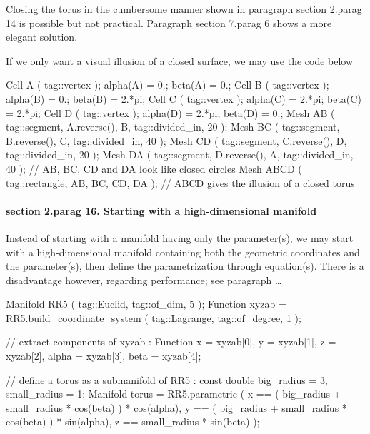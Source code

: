 Closing the torus in the cumbersome manner shown in paragraph \numb section 2.\numb parag 14
is possible but not practical.
Paragraph \numb section 7.\numb parag 6 shows a more elegant solution.

If we only want a visual illusion of a closed surface, we may use the code below

\verbatim
   Cell A ( tag::vertex );  alpha(A) = 0.;     beta(A) = 0.;
   Cell B ( tag::vertex );  alpha(B) = 0.;     beta(B) = 2.*pi;
   Cell C ( tag::vertex );  alpha(C) = 2.*pi;  beta(C) = 2.*pi;
   Cell D ( tag::vertex );  alpha(D) = 2.*pi;  beta(D) = 0.;
   Mesh AB ( tag::segment, A.reverse(), B, tag::divided_in, 20 );
   Mesh BC ( tag::segment, B.reverse(), C, tag::divided_in, 40 );
   Mesh CD ( tag::segment, C.reverse(), D, tag::divided_in, 20 );
   Mesh DA ( tag::segment, D.reverse(), A, tag::divided_in, 40 );
   // AB, BC, CD and DA look like closed circles
   Mesh ABCD ( tag::rectangle, AB, BC, CD, DA );
   // ABCD gives the illusion of a closed torus
\endverbatim
\vfil\eject


\paragraph{\numb section 2.\numb parag 16. Starting with a high-dimensional manifold}

Instead of starting with a manifold having only the parameter(s), we may start with a
high-dimensional manifold containing both the geometric coordinates and the parameter(s),
then define the parametrization through equation(s).
There is a disadvantage however, regarding performance; see paragraph \dots

\verbatim
   Manifold RR5 ( tag::Euclid, tag::of_dim, 5 );
   Function xyzab = RR5.build_coordinate_system ( tag::Lagrange, tag::of_degree, 1 );

   // extract components of xyzab :
   Function x = xyzab[0], y = xyzab[1], z = xyzab[2], alpha = xyzab[3], beta = xyzab[4];

   // define a torus as a submanifold of RR5 :
   const double big_radius = 3, small_radius = 1;
   Manifold torus = RR5.parametric
      ( x == ( big_radius + small_radius * cos(beta) ) * cos(alpha),
        y == ( big_radius + small_radius * cos(beta) ) * sin(alpha),
        z == small_radius * sin(beta)                                );

